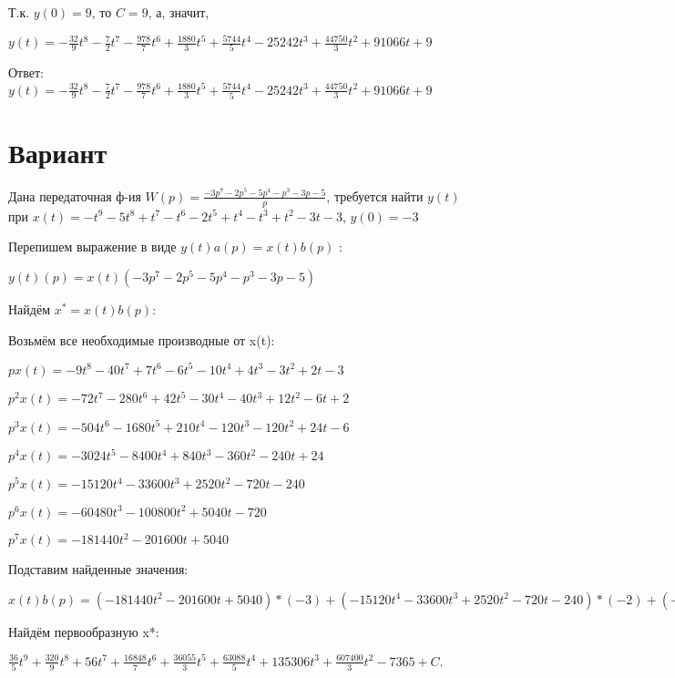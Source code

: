 \documentclass{article}
\begin{document}
{{{{{Т.к. $y(0)=9$, то $C=9$, а, значит, 

$y(t)=-\frac{32}{9}t^{8}-\frac{7}{2}t^{7}-\frac{978}{7}t^{6}+\frac{1880}{3}t^{5}+\frac{5744}{5}t^{4}-25242t^{3}+\frac{44750}{3}t^{2}+91066t+9$

Ответ: $y(t) = -\frac{32}{9}t^{8}-\frac{7}{2}t^{7}-\frac{978}{7}t^{6}+\frac{1880}{3}t^{5}+\frac{5744}{5}t^{4}-25242t^{3}+\frac{44750}{3}t^{2}+91066t+9$

\section{Вариант}

Дана передаточная ф-ия $W(p)=\frac{-3p^{7}-2p^{5}-5p^{4}-p^{3}-3p-5}{p}$, требуется найти $y(t)$ при $x(t)=-t^{9}-5t^{8}+t^{7}-t^{6}-2t^{5}+t^{4}-t^{3}+t^{2}-3t-3$, $y(0)=-3$

Перепишем выражение в виде $y(t)a(p)=x(t)b(p)$ :

$y(t)(p)=x(t)(-3p^{7}-2p^{5}-5p^{4}-p^{3}-3p-5)$

Найдём $x^*=x(t)b(p)$:

Возьмём все необходимые производные от x(t):

$px(t)=-9t^{8}-40t^{7}+7t^{6}-6t^{5}-10t^{4}+4t^{3}-3t^{2}+2t-3$

$p^2x(t)=-72t^{7}-280t^{6}+42t^{5}-30t^{4}-40t^{3}+12t^{2}-6t+2$

$p^3x(t)=-504t^{6}-1680t^{5}+210t^{4}-120t^{3}-120t^{2}+24t-6$

$p^4x(t)=-3024t^{5}-8400t^{4}+840t^{3}-360t^{2}-240t+24$

$p^5x(t)=-15120t^{4}-33600t^{3}+2520t^{2}-720t-240$

$p^6x(t)=-60480t^{3}-100800t^{2}+5040t-720$

$p^7x(t)=-181440t^{2}-201600t+5040$

Подставим найденные значения:

$x(t)b(p) = (-181440t^{2}-201600t+5040)*(-3)+(-15120t^{4}-33600t^{3}+2520t^{2}-720t-240)*(-2)+(-3024t^{5}-8400t^{4}+840t^{3}-360t^{2}-240t+24)*(-5)+(-504t^{6}-1680t^{5}+210t^{4}-120t^{3}-120t^{2}+24t-6)*(-1)+(-9t^{8}-40t^{7}+7t^{6}-6t^{5}-10t^{4}+4t^{3}-3t^{2}+2t-3)*(-3)+(-9t^{8}-40t^{7}+7t^{6}-6t^{5}-10t^{4}+4t^{3}-3t^{2}+2t-3)*(-5)=72t^{8}+320t^{7}+448t^{6}+16848t^{5}+72110t^{4}+63088t^{3}+541224t^{2}+607400t$





Найдём первообразную x*:

$\frac{36}{5}t^{9}+\frac{320}{9}t^{8}+56t^{7}+\frac{16848}{7}t^{6}+\frac{36055}{3}t^{5}+\frac{63088}{5}t^{4}+135306t^{3}+\frac{607400}{3}t^{2}-7365+C.$

}}}}}
\end{document}
